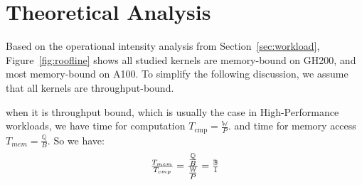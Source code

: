 


\section{Theoretical Analysis}\label{sec:theory}
Based on the operational intensity analysis from Section~\ref{sec:workload}, Figure~\ref{fig:roofline} shows all studied kernels are memory-bound on GH200, and most memory-bound on A100. To simplify the following discussion, we assume that all kernels are throughput-bound. 



when it is throughput bound, which is usually the case in High-Performance workloads, we have time for computation $T_{\text{cmp}}=\tfrac{\mathbb{W}}{P}$. 
and time for memory access $T_{mem}=\tfrac{\mathbb{Q}}{B}$.
So we have:
\begin{equation}\footnotesize
    \tfrac{T_{mem}}{T_{cmp}}=\tfrac{\tfrac{\mathbb{Q}}{B}}{\tfrac{\mathbb{W}}{P}}=\tfrac{\mathbb{B}}{\mathbb{I}}
\end{equation}

